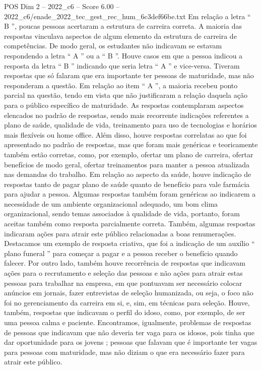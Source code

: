 \begin{textsample}{POS Dim 2 – 2022\_c6 – Score 6.00 – 2022\_c6/enade\_2022\_tec\_gest\_rec\_hum\_6c3def66be.txt}
Em relação a letra “ B ”, poucas pessoas acertaram a estrutura de carreira correta.
A maioria das respostas vinculava aspectos de algum elemento da estrutura de carreira de competências.
De modo geral, os estudantes não indicavam se estavam respondendo a letra “ A ” ou a “ B ”.
Houve casos em que a pessoa indicou a resposta da letra “ B ” indicando que seria letra “ A ” e vice-versa.
Tiveram respostas que só falaram que era importante ter pessoas de maturidade, mas não responderam a questão.
Em relação ao item “ A ”, a maioria recebeu ponto parcial na questão, tendo em vista que não justificaram a relação daquela ação para o público específico de maturidade.
As respostas contemplaram aspectos elencados no padrão de respostas, sendo mais recorrente indicações referentes a plano de saúde, qualidade de vida, treinamento para uso de tecnologias e horários mais flexíveis ou home office.
Além disso, houve respostas correlatas ao que foi apresentado no padrão de respostas, mas que foram mais genéricas e teoricamente também estão corretas, como, por exemplo, ofertar um plano de carreira, ofertar benefícios de modo geral, ofertar treinamentos para manter a pessoa atualizada nas demandas do trabalho.
Em relação ao aspecto da saúde, houve indicação de respostas tanto de pagar plano de saúde quanto de benefício para vale farmácia para ajudar a pessoa.
Algumas respostas também foram genéricas ao indicarem a necessidade de um ambiente organizacional adequado, um bom clima organizacional, sendo temas associados à qualidade de vida, portanto, foram aceitas também como resposta parcialmente correta.
Também, algumas respostas indicaram ações para atrair este público relacionadas a boas renumerações.
Destacamos um exemplo de resposta criativa, que foi a indicação de um auxílio “ plano funeral ” para começar a pagar e a pessoa receber o benefício quando falecer.
Por outro lado, também houve recorrência de respostas que indicavam ações para o recrutamento e seleção das pessoas e não ações para atrair estas pessoas para trabalhar na empresa, em que pontuavam ser necessário colocar anúncios em jornais, fazer entrevistas de seleção humanizada, ou seja, o foco não foi no gerenciamento da carreira em si, e, sim, em técnicas para seleção.
Houve, também, respostas que indicavam o perfil do idoso, como, por exemplo, de ser uma pessoa calma e paciente.
Encontramos, igualmente, problemas de respostas de pessoas que indicavam que não deveria ter vaga para os idosos, pois tinha que dar oportunidade para os jovens ; pessoas que falavam que é importante ter vagas para pessoas com maturidade, mas não diziam o que era necessário fazer para atrair este público.

\end{textsample}
